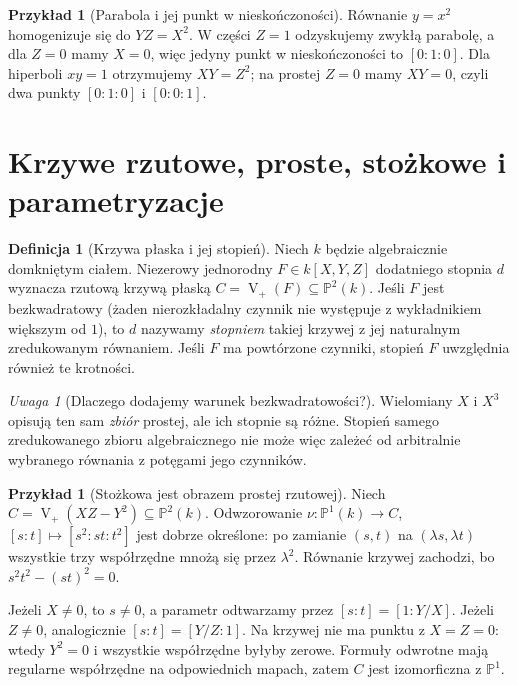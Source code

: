 \documentclass[11pt,a4paper,openany]{report}
\numberwithin{equation}{section}
\theoremstyle{plain}
\theoremstyle{definition}
\newtheorem{definicja}[twierdzenie]{Definicja}
\newtheorem{przyklad}[twierdzenie]{Przykład}
\theoremstyle{remark}
\newtheorem{uwaga}[twierdzenie]{Uwaga}
\newcommand{\PP}{\mathbb P}
\newcommand{\V}{\operatorname V}
\begin{document}
\begin{przyklad}[Parabola i jej punkt w nieskończoności]
Równanie $y=x^2$ homogenizuje się do $YZ=X^2$.
W części $Z=1$ odzyskujemy zwykłą parabolę, a dla $Z=0$
mamy $X=0$, więc jedyny punkt w nieskończoności to $[0:1:0]$.
Dla hiperboli $xy=1$ otrzymujemy $XY=Z^2$;
na prostej $Z=0$ mamy $XY=0$, czyli dwa punkty
$[0:1:0]$ i $[0:0:1]$.
\end{przyklad}

\section{Krzywe rzutowe, proste, stożkowe i parametryzacje}

\begin{definicja}[Krzywa płaska i jej stopień]
Niech $k$ będzie algebraicznie domkniętym ciałem.
Niezerowy jednorodny $F\in k[X,Y,Z]$ dodatniego stopnia $d$
wyznacza rzutową krzywą płaską $C=\V_+(F)\subseteq\PP^2(k)$.
Jeśli $F$ jest bezkwadratowy (żaden nierozkładalny czynnik
nie występuje z wykładnikiem większym od $1$), to $d$
nazywamy \emph{stopniem} takiej krzywej z jej naturalnym
zredukowanym równaniem. Jeśli $F$ ma powtórzone czynniki,
stopień $F$ uwzględnia również te krotności.
\end{definicja}

\begin{uwaga}[Dlaczego dodajemy warunek bezkwadratowości?]
Wielomiany $X$ i $X^3$ opisują ten sam \emph{zbiór} prostej,
ale ich stopnie są różne. Stopień samego zredukowanego
zbioru algebraicznego nie może więc zależeć od arbitralnie
wybranego równania z potęgami jego czynników.
\end{uwaga}

\begin{przyklad}[Stożkowa jest obrazem prostej rzutowej]
Niech $C=\V_+(XZ-Y^2)\subseteq\PP^2(k)$.
Odwzorowanie
$\nu:\PP^1(k)\to C$, $[s:t]\mapsto[s^2:st:t^2]$
jest dobrze określone: po zamianie $(s,t)$ na
$(\lambda s,\lambda t)$ wszystkie trzy współrzędne
mnożą się przez $\lambda^2$. Równanie krzywej zachodzi,
bo $s^2t^2-(st)^2=0$.

Jeżeli $X\ne0$, to $s\ne0$, a parametr odtwarzamy przez
$[s:t]=[1:Y/X]$. Jeżeli $Z\ne0$, analogicznie
$[s:t]=[Y/Z:1]$. Na krzywej nie ma punktu z $X=Z=0$:
wtedy $Y^2=0$ i wszystkie współrzędne byłyby zerowe.
Formuły odwrotne mają regularne współrzędne na odpowiednich
mapach, zatem $C$ jest izomorficzna z $\PP^1$.
\end{przyklad}
\end{document}
